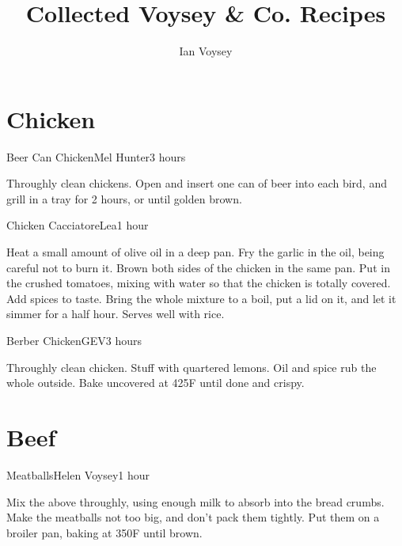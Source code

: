 \documentclass{book}
\title{Collected Voysey \& Co. Recipes}
\author{Ian Voysey}
\begin{document}
\maketitle
\tableofcontents
\chapter{Chicken}
\begin{recipe}{Beer Can Chicken}{Mel Hunter}{3 hours}
  
  Throughly clean chickens. Open and insert one can of beer into each
  bird, and grill in a tray for 2 hours, or until golden brown.
\end{recipe}

\begin{recipe}{Chicken Cacciatore}{Lea}{1 hour}

  Heat a small amount of olive oil in a deep pan. Fry the garlic in the oil,
  being careful not to burn it. Brown both sides of the chicken in the same
  pan. Put in the crushed tomatoes, mixing with water so that the chicken is
  totally covered. Add spices to taste. Bring the whole mixture to a boil, put
  a lid on it, and let it simmer for a half hour. Serves well with rice.
\end{recipe}

\begin{recipe}{Berber Chicken}{GEV}{3 hours}
  
  Throughly clean chicken. Stuff with quartered lemons. Oil and spice rub the
  whole outside. Bake uncovered at 425\0F until done and crispy.
\end{recipe}

\chapter{Beef}
\begin{recipe}{Meatballs}{Helen Voysey}{1 hour}

  Mix the above throughly, using enough milk to absorb into the bread
  crumbs. Make the meatballs not too big, and don't pack them tightly. Put
  them on a broiler pan, baking at 350\0F until brown. 
\end{recipe}
\end{document}
